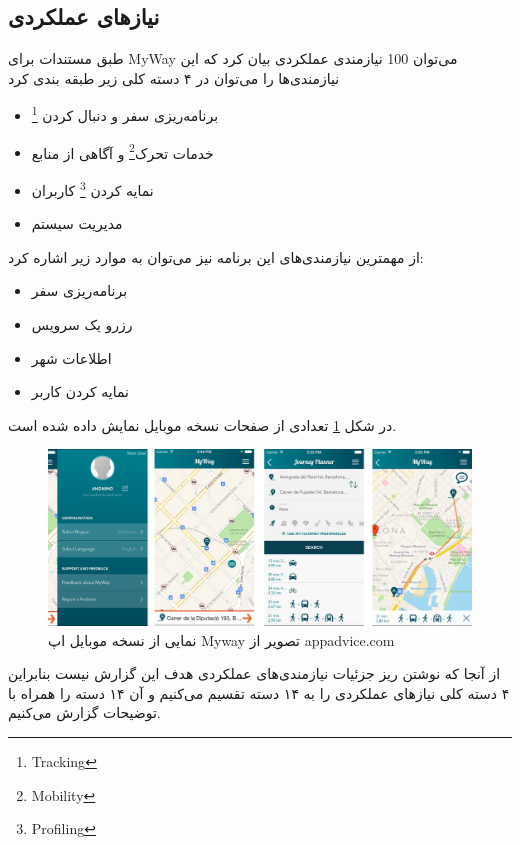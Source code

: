 \subsection{نیازهای عملکردی }

طبق مستندات \cite{myway_req}برای MyWay می‌توان 100 نیازمندی عملکردی بیان کرد که این نیازمندی‌ها را می‌توان در ۴ دسته کلی زیر طبقه بندی کرد

\begin{itemize}
\item
برنامه‌ریزی سفر و دنبال کردن \footnote{Tracking}
\item 
خدمات تحرک\footnote{Mobility} و آگاهی از منابع
\item 
نمایه کردن \footnote{Profiling} کاربران 
\item 
مدیریت سیستم
\end{itemize} 


از مهمترین نیازمندی‌های این برنامه نیز می‌توان به موارد زیر اشاره کرد:
\begin{itemize}
\item
برنامه‌ریزی سفر
\item
رزرو یک سرویس
\item 
اطلاعات شهر 
\item
نمایه کردن کاربر 
\end{itemize}

در شکل \ref{fig: myway} تعدادی از صفحات نسخه موبایل نمایش داده شده است.
\begin{figure}[htb]
\centering
\includegraphics[scale=0.4]{myway.png}
\caption{نمایی از نسخه موبایل اپ Myway تصویر از appadvice.com}
\label{fig: myway}
\end{figure}
از آنجا که نوشتن ریز جزئیات نیازمندی‌های عملکردی هدف این گزارش نیست بنابراین ۴ دسته کلی نیازهای عملکردی را به ۱۴ دسته تقسیم می‌کنیم و آن ۱۴ دسته را همراه با توضیحات گزارش می‌کنیم. 

